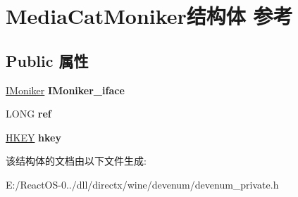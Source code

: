 \hypertarget{struct_media_cat_moniker}{}\section{Media\+Cat\+Moniker结构体 参考}
\label{struct_media_cat_moniker}
\subsection*{Public 属性}
\begin{DoxyCompactItemize}
\item 
\mbox{\label{struct_media_cat_moniker_a7e456e82e05516996802ec1c3babb1c5}} 
\hyperlink{interface_i_moniker}{I\+Moniker} {\bfseries I\+Moniker\+\_\+iface}
\item 
\mbox{\label{struct_media_cat_moniker_af39bc1d20628866717fd8fc61c050cc9}} 
L\+O\+NG {\bfseries ref}
\item 
\mbox{\label{struct_media_cat_moniker_a4b19a5aca15956b423a7164a0c3c37dc}} 
\hyperlink{interfacevoid}{H\+K\+EY} {\bfseries hkey}
\end{DoxyCompactItemize}


该结构体的文档由以下文件生成\+:\begin{DoxyCompactItemize}
\item 
E\+:/\+React\+O\+S-\/0../dll/directx/wine/devenum/devenum\+\_\+private.\+h\end{DoxyCompactItemize}

